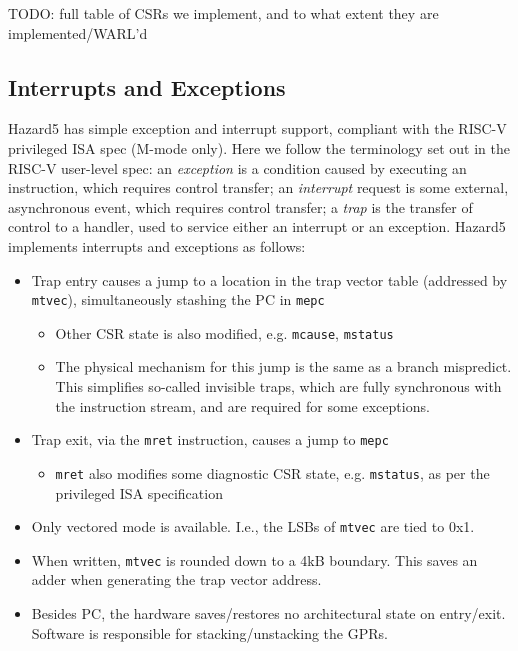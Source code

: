 TODO: full table of CSRs we implement, and to what extent they are implemented/WARL'd

\subsection{Interrupts and Exceptions}

Hazard5 has simple exception and interrupt support, compliant with the RISC-V privileged ISA spec (M-mode only). Here we follow the terminology set out in the RISC-V user-level spec: an {\it exception} is a condition caused by executing an instruction, which requires control transfer; an {\it interrupt} request is some external, asynchronous event, which requires control transfer; a {\it trap} is the transfer of control to a handler, used to service either an interrupt or an exception. Hazard5 implements interrupts and exceptions as follows:

\begin{itemize}
	\item Trap entry causes a jump to a location in the trap vector table (addressed by {\tt mtvec}), simultaneously stashing the PC in {\tt mepc}
	\begin{itemize}
		\item Other CSR state is also modified, e.g. {\tt mcause}, {\tt mstatus}
		\item The physical mechanism for this jump is the same as a branch mispredict. This simplifies so-called invisible traps, which are fully synchronous with the instruction stream, and are required for some exceptions.
	\end{itemize}
	\item Trap exit, via the {\tt mret} instruction, causes a jump to {\tt mepc}
	\begin{itemize}
		\item {\tt mret} also modifies some diagnostic CSR state, e.g. {\tt mstatus}, as per the privileged ISA specification
	\end{itemize}
	\item Only vectored mode is available. I.e., the LSBs of {\tt mtvec} are tied to 0x1.
	\item When written, {\tt mtvec} is rounded down to a 4kB boundary. This saves an adder when generating the trap vector address.
	\item Besides PC, the hardware saves/restores no architectural state on entry/exit. Software is responsible for stacking/unstacking the GPRs.
\end{itemize}

